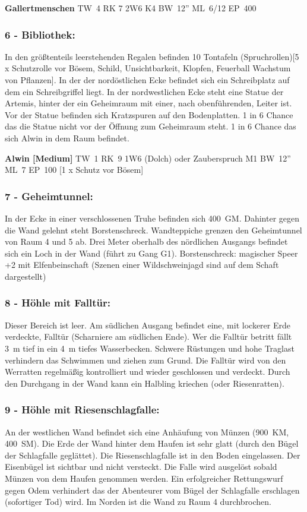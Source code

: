 \textbf{Gallertmenschen} TW~4 RK 7 2W6 K4 BW~12'' ML~6/12 EP~400

\subsubsection{6 - Bibliothek:} In den größtenteils leerstehenden Regalen befinden
10 Tontafeln (Spruchrollen)[5 x Schutzrolle vor Bösem, Schild,
Unsichtbarkeit, Klopfen, Feuerball Wachstum von Pflanzen]. In der
der nordöstlichen Ecke befindet sich ein Schreibplatz auf dem ein
Schreibgriffel liegt. In der nordwestlichen Ecke steht eine Statue der
Artemis, hinter der ein Geheimraum mit einer, nach obenführenden, Leiter
ist. Vor der Statue befinden sich Kratzspuren auf den Bodenplatten. 1 in
6 Chance das die Statue nicht vor der Öffnung zum Geheimraum steht. 1
in 6 Chance das sich Alwin in dem Raum befindet.  

\textbf{Alwin [Medium]} TW~1 RK~9
1W6 (Dolch) oder Zauberspruch M1 BW~12'' ML~7 EP~100 [1 x Schutz vor Bösem]
 

\subsubsection{7 - Geheimtunnel:} In der Ecke in einer verschlossenen Truhe befinden sich
400~GM. Dahinter gegen die Wand gelehnt steht Borstenschreck. Wandteppiche
grenzen den Geheimtunnel von Raum 4 und 5 ab. Drei Meter oberhalb des nördlichen
Ausgangs befindet sich ein Loch in der Wand (führt zu Gang G1).
Borstenschreck: magischer Speer +2 mit Elfenbeinschaft (Szenen einer
Wildschweinjagd sind auf dem Schaft dargestellt)

\subsubsection{8 - Höhle mit Falltür:} Dieser Bereich ist leer. Am südlichen Ausgang
befindet eine, mit lockerer Erde verdeckte, Falltür (Scharniere am
südlichen Ende). Wer die Falltür betritt fällt 3~m tief in ein 4~m
tiefes Wasserbecken. Schwere Rüstungen und hohe Traglast verhindern das
Schwimmen und ziehen zum Grund.  Die Falltür wird von den Werratten
regelmäßig kontrolliert und wieder geschlossen und verdeckt. Durch
den Durchgang in der Wand kann ein Halbling kriechen (oder Riesenratten).

\subsubsection{9 - Höhle mit Riesenschlagfalle:} An der westlichen Wand befindet sich
eine Anhäufung von Münzen (900~KM, 400~SM). Die Erde der Wand hinter dem
Haufen ist sehr glatt (durch den Bügel der Schlagfalle geglättet). Die
Riesenschlagfalle ist in den Boden eingelassen. Der Eisenbügel ist
sichtbar und nicht versteckt. Die Falle wird ausgelöst sobald Münzen
von dem Haufen genommen werden. Ein erfolgreicher Rettungswurf gegen
Odem verhindert das der Abenteurer vom Bügel der Schlagfalle erschlagen
(sofortiger Tod) wird. Im Norden ist die Wand zu Raum 4 durchbrochen.


